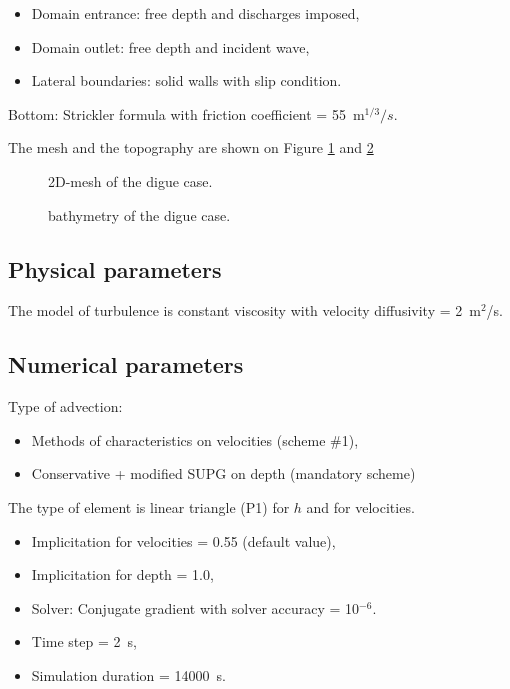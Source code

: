 \begin{itemize}
\item Domain entrance: free depth and discharges imposed,
\item Domain outlet: free depth and incident wave,
\item Lateral boundaries: solid walls with slip condition.
\end{itemize}

Bottom: Strickler formula with friction coefficient = 55~m$^{1/3}/s$.

The mesh and the topography are shown on Figure \ref{fig:digue:Mesh} and \ref{fig:digue:Bathy}

\begin{figure}[H]
 \centering
  \caption{2D-mesh of the digue case.}\label{fig:digue:Mesh}
\end{figure}


\begin{figure}[H]
 \centering
  \caption{bathymetry of the digue case.}\label{fig:digue:Bathy}
\end{figure}

\subsection{Physical parameters}

The model of turbulence is constant viscosity
with velocity diffusivity = 2~m$^2$/s.

\subsection{Numerical parameters}
Type of advection:
\begin{itemize}
\item Methods of characteristics on velocities (scheme \#1),
\item Conservative + modified SUPG on depth (mandatory scheme)
\end{itemize}

The type of element is linear triangle (P1) for $h$ and for velocities.

\begin{itemize}
\item Implicitation for velocities = 0.55 (default value),
\item Implicitation for depth = 1.0,
\item Solver: Conjugate gradient with solver accuracy = 10$^{-6}$.
\item Time step = 2~s,
\item Simulation duration = 14000~s.
\end{itemize}

